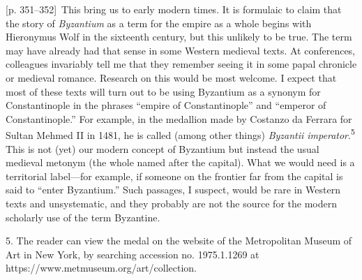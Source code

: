 \documentclass[10pt,a4paper]{article}
\begin{document}
{\scriptsize\color{gray}[p. 351–352]}\ This bring us to early modern times. It is formulaic to claim that the story of \textit{Byzantium} as a term for the empire as a whole begins with Hieronymus Wolf in the sixteenth century, but this unlikely to be true. The term may have already had that sense in some Western medieval texts. At conferences, colleagues invariably tell me that they remember seeing it in some papal chronicle or medieval romance. Research on this would be most welcome. I expect that most of these texts will turn out to be using Byzantium as a synonym for Constantinople in the phrases “empire of Constantinople” and “emperor of Constantinople.” For example, in the medallion made by Costanzo da Ferrara for Sultan Mehmed II in 1481, he is called (among other things) \textit{Byzantii imperator}.\nobreak\textsuperscript{5} This is not (yet) our modern concept of Byzantium but instead the usual medieval metonym (the whole named after the capital). What we would need is a territorial label—for example, if someone on the frontier far from the capital is said to “enter Byzantium.” Such passages, I suspect, would be rare in Western texts and unsystematic, and they probably are not the source for the modern scholarly use of the term Byzantine.\par{\small 5.  The reader can view the medal on the website of the Metropolitan Museum of Art in New York, by searching accession no. 1975.1.1269 at https://www.metmuseum.org/art/collection.\par}
\end{document}
